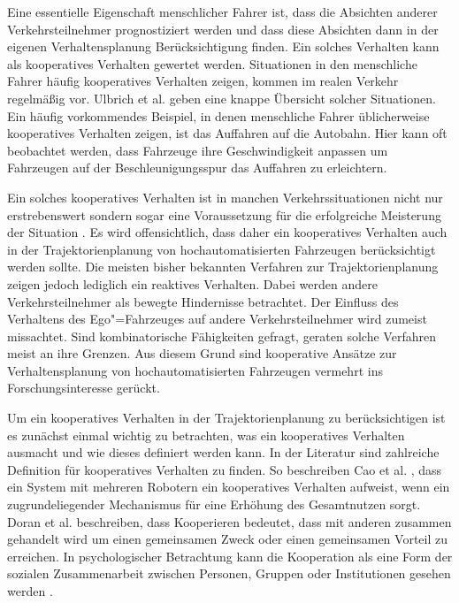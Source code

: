 Eine essentielle Eigenschaft menschlicher Fahrer ist, dass die Absichten anderer Verkehrsteilnehmer prognostiziert werden und dass diese Absichten dann in der eigenen Verhaltensplanung Ber\"ucksichtigung finden. 
Ein solches Verhalten kann als kooperatives Verhalten gewertet werden. \cite{Lenz2016} 
Situationen in den menschliche Fahrer h\"aufig kooperatives Verhalten zeigen, kommen im realen Verkehr regelm\"a{\ss}ig vor. 
Ulbrich et al. \cite{Ulbrich2015} geben eine knappe \"Ubersicht solcher Situationen. 
Ein h\"aufig vorkommendes Beispiel, in denen menschliche Fahrer \"ublicherweise kooperatives Verhalten zeigen, ist das Auffahren auf die Autobahn. 
Hier kann oft beobachtet werden, dass Fahrzeuge ihre Geschwindigkeit anpassen um Fahrzeugen auf der Beschleunigungsspur das Auffahren zu erleichtern.

Ein solches kooperatives Verhalten ist in manchen Verkehrssituationen nicht nur erstrebenswert sondern sogar eine Voraussetzung f\"ur die erfolgreiche Meisterung der Situation \cite{Lenz2016}. 
Es wird offensichtlich, dass daher ein kooperatives Verhalten auch in der Trajektorienplanung von hochautomatisierten Fahrzeugen ber\"ucksichtigt werden sollte. 
Die meisten bisher bekannten Verfahren zur Trajektorienplanung zeigen jedoch lediglich ein reaktives Verhalten.
Dabei werden andere Verkehrsteilnehmer als bewegte Hindernisse betrachtet.
Der Einfluss des Verhaltens des Ego"=Fahrzeuges auf andere Verkehrsteilnehmer wird zumeist missachtet.
Sind kombinatorische F\"ahigkeiten gefragt, geraten solche Verfahren meist an ihre Grenzen.
Aus diesem Grund sind kooperative Ans\"atze zur Verhaltensplanung von hochautomatisierten Fahrzeugen vermehrt ins Forschungsinteresse ger\"uckt. \cite{Naumann2017towards}

Um ein kooperatives Verhalten in der Trajektorienplanung zu ber\"ucksichtigen ist es zun\"achst einmal wichtig zu betrachten, was ein kooperatives Verhalten ausmacht und wie dieses definiert werden kann. 
In der Literatur sind zahlreiche Definition f\"ur kooperatives Verhalten zu finden. 
So beschreiben Cao et al. \cite{Cao1997}, dass ein System mit mehreren Robotern ein kooperatives Verhalten aufweist, wenn \glqq ein zugrundeliegender Mechanismus f\"ur eine Erh\"ohung des Gesamtnutzen sorgt\grqq{}. 
Doran et al. \cite{Doran1997} beschreiben, dass Kooperieren bedeutet, dass \glqq mit anderen zusammen gehandelt wird um einen gemeinsamen Zweck oder einen gemeinsamen Vorteil zu erreichen\grqq{}. 
In psychologischer Betrachtung kann die Kooperation als eine Form der sozialen Zusammenarbeit zwischen Personen, Gruppen oder Institutionen gesehen werden \cite{Spiess2014}.


